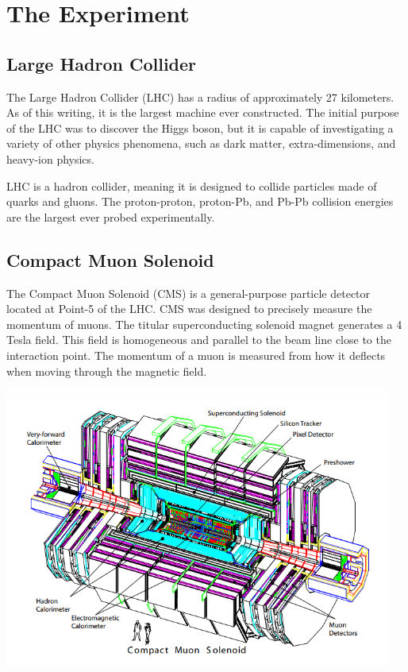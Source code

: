 
\chapter{The Experiment}

\section{Large Hadron Collider}

The Large Hadron Collider (LHC) has a radius of approximately 27 kilometers. As of this writing, it is the largest machine ever constructed. The initial purpose of the LHC was to discover the Higgs boson, but it is capable of investigating a variety of other physics phenomena, such as dark matter, extra-dimensions, and heavy-ion physics. 

LHC is a hadron collider, meaning it is designed to collide particles made of quarks and gluons. The proton-proton, proton-Pb, and Pb-Pb collision energies are the largest ever probed experimentally.

\section{Compact Muon Solenoid}

The Compact Muon Solenoid (CMS) is a general-purpose particle detector located at Point-5 of the LHC. CMS was designed to precisely measure the momentum of muons. The titular superconducting solenoid magnet generates a 4 Tesla field. This field is homogeneous and parallel to the beam line close to the interaction point. The momentum of a muon is measured from how it deflects when moving through the magnetic field. 

\centerline{
\includegraphics[width=5in]{Chapter3/importfigs/fromCMS_DesignPaper_perspective.png}
}

